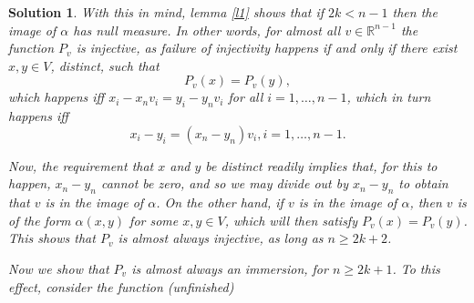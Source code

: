 \documentclass{article}
\theoremstyle{nonumberplain}
\newtheorem{sol}{Solution}
\newcommand{\R}{\mathbb{R}}
\begin{document}
\begin{sol}
With this in mind, lemma \ref{l1} shows that if $2k < n-1$ then the image of $\alpha$ has null measure. In other words, for almost all $v \in \R^{n-1}$ the function $P_v$ is injective, as failure of injectivity happens if and only if there exist $x, y \in V$, distinct, such that
\[P_v(x) = P_v(y),\]
which happens iff $x_i - x_n v_i = y_i - y_n v_i$ for all $i = 1, \dots, n-1$, which in turn happens iff
\[x_i - y_i = (x_n - y_n) v_i, i = 1, \dots, n-1.\]

Now, the requirement that $x$ and $y$ be distinct readily implies that, for this to happen, $x_n - y_n$ cannot be zero, and so we may divide out by $x_n - y_n$ to obtain that $v$ is in the image of $\alpha$. On the other hand, if $v$ is in the image of $\alpha$, then $v$ is of the form $\alpha(x,y)$ for some $x,y \in V$, which will then satisfy $P_v(x) = P_v(y)$. This shows that $P_v$ is almost always injective, as long as $n \geq 2k + 2$.

Now we show that $P_v$ is almost always an immersion, for $n \geq 2k + 1$. To this effect, consider the function
(unfinished)
\end{sol}
\end{document}
